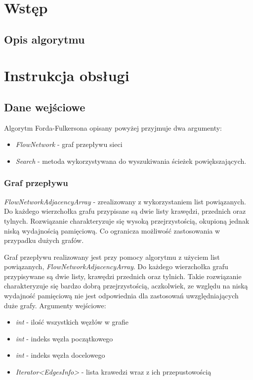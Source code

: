 \documentclass[10pt]{minutes}
\begin{document}
\MakeMinutesMeta


\section{Wstęp} %
  \subsection{Opis algorytmu}

\section{Instrukcja obsługi}
  \subsection{Dane wejściowe}
    Algorytm Forda-Fulkersona opisany powyżej przyjmuje dwa argumenty:
    \begin{itemize}
      \item \emph{FlowNetwork} - graf przepływu sieci
      \item \emph{Search} - metoda wykorzystywana do wyszukiwania ścieżek powiększających.
    \end{itemize}

  \subsubsection{Graf przepływu}
	\item \emph{FlowNetworkAdjacencyArray} - zrealizowany z wykorzystaniem list powiązanych. Do każdego wierzchołka grafu przypisane są dwie listy krawędzi, przednich oraz tylnych. Rozwiązanie charakteryzuje się wysoką przejrzystością, okupioną jednak niską wydajnością pamięciową. Co ogranicza możliwość zastosowania w przypadku dużych grafów.

    Graf przepływu realizowany jest przy pomocy algorytmu z użyciem list powiązanych, \emph{FlowNetworkAdjacencyArray}. Do każdego wierzchołka grafu przypisywane są dwie listy,
 krawędzi przednich oraz tylnich. Takie rozwiązanie charakteryzuje się bardzo dobrą przejrzystością, aczkolwiek, ze względu na niską wydajność pamięciową nie jest odpowiednia dla zastosowań uwzględniających duże grafy.
Argumenty wejściowe:
    \begin{itemize}
      \item \emph{int} - ilość wszystkich węzłów w grafie
      \item \emph{int} - indeks węzła początkowego
      \item \emph{int} - indeks węzła docelowego
      \item \emph{Iterator<EdgesInfo>} - lista krawedzi wraz z ich przepustowością
    \end{itemize}
\end{document}
